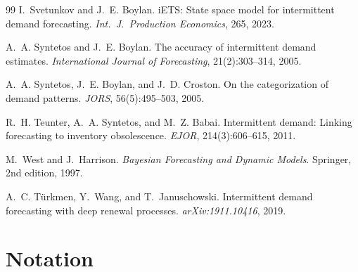 \documentclass[twoside]{article}
\theoremstyle{definition}
\begin{document}
\begin{thebibliography}{99}
I.~Svetunkov and J.~E. Boylan.
\newblock iETS: State space model for intermittent demand forecasting.
\newblock \emph{Int.\ J.\ Production Economics}, 265, 2023.

A.~A. Syntetos and J.~E. Boylan.
\newblock The accuracy of intermittent demand estimates.
\newblock \emph{International Journal of Forecasting}, 21(2):303--314, 2005.

A.~A. Syntetos, J.~E. Boylan, and J.~D. Croston.
\newblock On the categorization of demand patterns.
\newblock \emph{JORS}, 56(5):495--503, 2005.

R.~H. Teunter, A.~A. Syntetos, and M.~Z. Babai.
\newblock Intermittent demand: Linking forecasting to inventory
  obsolescence.
\newblock \emph{EJOR}, 214(3):606--615, 2011.

M.~West and J.~Harrison.
\newblock \emph{Bayesian Forecasting and Dynamic Models}.
\newblock Springer, 2nd edition, 1997.

A.~C. T\"urkmen, Y.~Wang, and T.~Januschowski.
\newblock Intermittent demand forecasting with deep renewal processes.
\newblock \emph{arXiv:1911.10416}, 2019.

\end{thebibliography}

\appendix
\onecolumn

\section{Notation}\label{app:notation}
\end{document}
